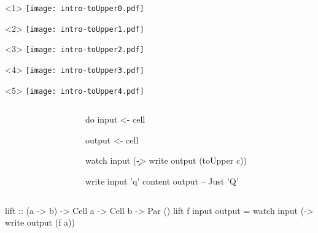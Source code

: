 \documentclass[UKenglish,usenames,dvipsnames,svgnames,table,aspectratio=169,mathserif]{beamer}
\newcommand{\nl}{\vspace{\baselineskip}}
\newcommand{\pnl}{\pause \nl}
\begin{document}
\begin{frame}[fragile]
\centering

\begin{overlayarea}{0.5\textwidth}{0.4\textheight}
\begin{onlyenv}<1>
\texttt{[image: intro-toUpper0.pdf]}
\end{onlyenv}
\begin{onlyenv}<2>
\texttt{[image: intro-toUpper1.pdf]}
\end{onlyenv}
\begin{onlyenv}<3>
\texttt{[image: intro-toUpper2.pdf]}
\end{onlyenv}
\begin{onlyenv}<4>
\texttt{[image: intro-toUpper3.pdf]}
\end{onlyenv}
\begin{onlyenv}<5>
\texttt{[image: intro-toUpper4.pdf]}
\end{onlyenv}
\end{overlayarea}


\begin{columns}
\begin{column}{0.3\textwidth}
\end{column}
\begin{column}{0.7\textwidth}
\begin{haskellcode}
do
  input  <- cell
\end{haskellcode}
\pause
\begin{haskellcode}
  output <- cell
\end{haskellcode}
\pause
\begin{haskellcode}
  watch input (\c ->
    write output (toUpper c))
\end{haskellcode}
\pnl
\begin{haskellcode}
  write input 'q'
  content output   -- Just 'Q'
\end{haskellcode}
\end{column}
\end{columns}
\end{frame}


\begin{frame}[fragile]
\begin{haskellcode}
          lift :: (a -> b) -> Cell a -> Cell b -> Par ()
          lift f input output =
            watch input (\a ->
              write output (f a))
\end{haskellcode}
\end{frame}
\end{document}
